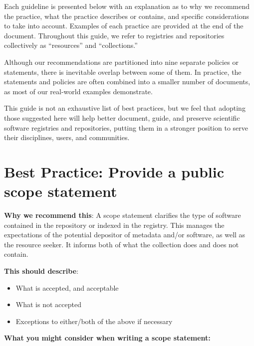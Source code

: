 \documentclass[11pt]{article}
\begin{document}
Each guideline is presented below with an explanation as to why we recommend the practice, what the practice describes or contains, and specific considerations to take into account. Examples of each practice are provided at the end of the document. Throughout this guide, we refer to registries and repositories collectively as ``resources'' and ``collections.''

Although our recommendations are partitioned into nine separate policies or statements, there is inevitable overlap between some of them. In practice, the statements and policies are often combined into a smaller number of documents, as most of our real-world examples demonstrate.

This guide is not an exhaustive list of best practices, but we feel that adopting those suggested here will help better document, guide, and preserve scientific software registries and repositories, putting them in a stronger position to serve their disciplines, users, and communities.


\section{Best Practice: Provide a public scope statement}
\label{best-practice-provide-a-public-scope-statement}

\textbf{Why we recommend this}: A scope statement clarifies the type of software contained in the repository or indexed in the registry. This manages the expectations of the potential depositor of metadata and/or software, as well as the resource seeker. It informs both of what the collection does and does not contain.

\textbf{This should describe}:

\begin{itemize}
\item What is accepted, and acceptable

\item What is not accepted

\item Exceptions to either/both of the above if necessary

\end{itemize}

\textbf{What you might consider when writing a scope statement: }
\end{document}
